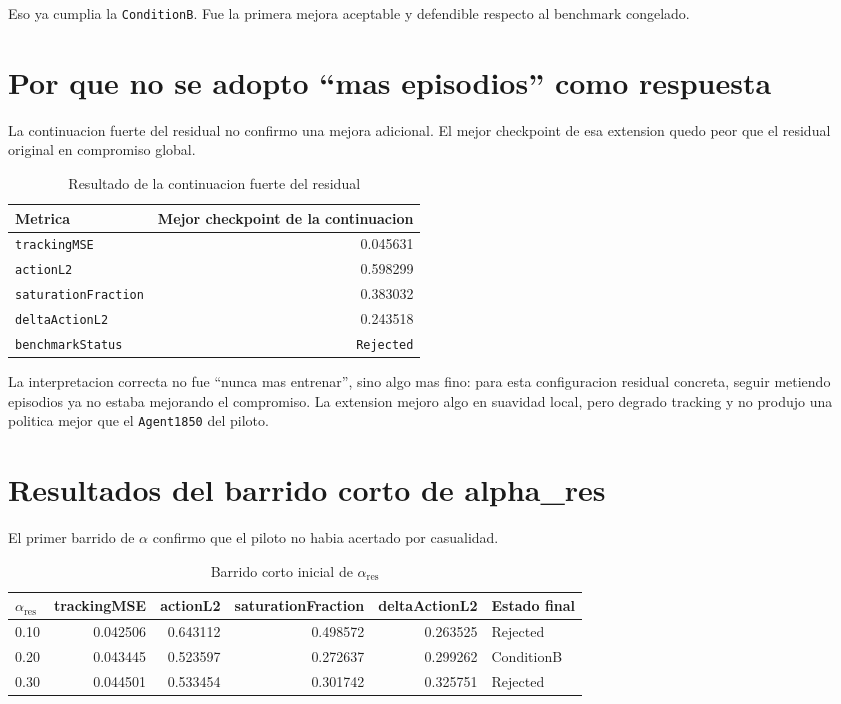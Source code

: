 \documentclass[11pt,a4paper]{article}
\begin{document}
Eso ya cumplia la \texttt{ConditionB}. Fue la primera mejora aceptable y defendible respecto al benchmark congelado.

\section{Por que no se adopto ``mas episodios'' como respuesta}

La continuacion fuerte del residual no confirmo una mejora adicional. El mejor checkpoint de esa extension quedo peor que el residual original en compromiso global.

\begin{table}[H]
\centering
\caption{Resultado de la continuacion fuerte del residual}
\begin{tabular}{lr}
\toprule
Metrica & Mejor checkpoint de la continuacion \\
\midrule
\texttt{trackingMSE} & 0.045631 \\
\texttt{actionL2} & 0.598299 \\
\texttt{saturationFraction} & 0.383032 \\
\texttt{deltaActionL2} & 0.243518 \\
\texttt{benchmarkStatus} & \texttt{Rejected} \\
\bottomrule
\end{tabular}
\end{table}

La interpretacion correcta no fue ``nunca mas entrenar'', sino algo mas fino: para esta configuracion residual concreta, seguir metiendo episodios ya no estaba mejorando el compromiso. La extension mejoro algo en suavidad local, pero degrado tracking y no produjo una politica mejor que el \texttt{Agent1850} del piloto.

\section{Resultados del barrido corto de alpha\_res}

El primer barrido de \(\alpha\) confirmo que el piloto no habia acertado por casualidad.

\begin{table}[H]
\centering
\caption{Barrido corto inicial de \(\alpha_{\mathrm{res}}\)}
\begin{tabular}{lrrrrl}
\toprule
\(\alpha_{\mathrm{res}}\) & trackingMSE & actionL2 & saturationFraction & deltaActionL2 & Estado final \\
\midrule
0.10 & 0.042506 & 0.643112 & 0.498572 & 0.263525 & Rejected \\
0.20 & 0.043445 & 0.523597 & 0.272637 & 0.299262 & ConditionB \\
0.30 & 0.044501 & 0.533454 & 0.301742 & 0.325751 & Rejected \\
\bottomrule
\end{tabular}
\end{table}
\end{document}
